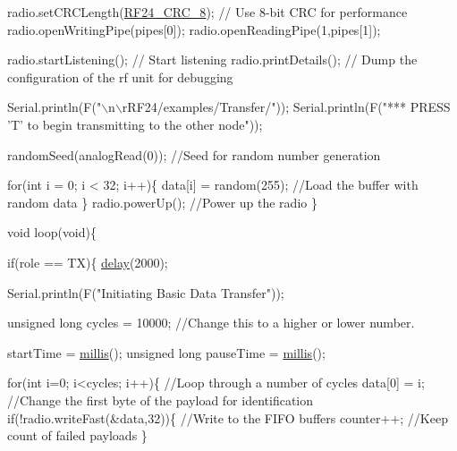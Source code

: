 \begin{DoxyCodeInclude}
  radio.setCRCLength(\hyperlink{RF24_8h_adbe00719f3f835c82bd007081d040a7eade0b6b3a0dd8729e2a17c49896e0a468}{RF24\_CRC\_8});          \textcolor{comment}{// Use 8-bit CRC for performance}
  radio.openWritingPipe(pipes[0]);
  radio.openReadingPipe(1,pipes[1]);
  
  radio.startListening();                  \textcolor{comment}{// Start listening}
  radio.printDetails();                    \textcolor{comment}{// Dump the configuration of the rf unit for debugging}
  
  Serial.println(F(\textcolor{stringliteral}{"\(\backslash\)n\(\backslash\)rRF24/examples/Transfer/"}));
  Serial.println(F(\textcolor{stringliteral}{"*** PRESS 'T' to begin transmitting to the other node"}));
  
  randomSeed(analogRead(0));               \textcolor{comment}{//Seed for random number generation}
  
  \textcolor{keywordflow}{for}(\textcolor{keywordtype}{int} i = 0; i < 32; i++)\{
     data[i] = random(255);                \textcolor{comment}{//Load the buffer with random data}
  \}
  radio.powerUp();                         \textcolor{comment}{//Power up the radio}
\}

\textcolor{keywordtype}{void} loop(\textcolor{keywordtype}{void})\{


  \textcolor{keywordflow}{if}(role == TX)\{
    \hyperlink{group__Porting__General_ga70a331e8ddf9acf9d33c47b71cda4c5f}{delay}(2000);
    
    Serial.println(F(\textcolor{stringliteral}{"Initiating Basic Data Transfer"}));
    
    
    \textcolor{keywordtype}{unsigned} \textcolor{keywordtype}{long} cycles = 10000; \textcolor{comment}{//Change this to a higher or lower number. }
    
    startTime = \hyperlink{group__Porting__General_gad5b3ec1ce839fa1c4337a7d0312e9749}{millis}();
    \textcolor{keywordtype}{unsigned} \textcolor{keywordtype}{long} pauseTime = \hyperlink{group__Porting__General_gad5b3ec1ce839fa1c4337a7d0312e9749}{millis}();
            
    \textcolor{keywordflow}{for}(\textcolor{keywordtype}{int} i=0; i<cycles; i++)\{        \textcolor{comment}{//Loop through a number of cycles}
      data[0] = i;                      \textcolor{comment}{//Change the first byte of the payload for identification}
      \textcolor{keywordflow}{if}(!radio.writeFast(&data,32))\{   \textcolor{comment}{//Write to the FIFO buffers        }
        counter++;                      \textcolor{comment}{//Keep count of failed payloads}
      \}
      

\end{DoxyCodeInclude}
